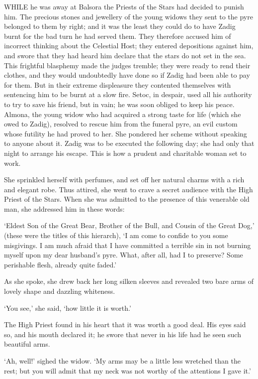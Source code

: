 \documentclass{article}
\begin{document}
\begin{center}
 

WHILE he was away at Balsora the Priests of the Stars had decided to punish him. 
The precious stones and jewellery of the young widows they sent to the pyre belonged 
to them by right; and it was the least they could do to have Zadig burnt for the 
bad turn he had served them. They therefore accused him of incorrect thinking about 
the Celestial Host; they entered depositions against him, and swore that they had 
heard him declare that the stars do not set in the sea. This frightful blasphemy 
made the judges tremble; they were ready to rend their clothes, and they would 
undoubtedly have done so if Zadig had been able to pay for them. But in their extreme 
displeasure they contented themselves with sentencing him to be burnt at a slow 
fire. Setoc, in despair, used all his authority to try to save his friend, but 
in vain; he was soon obliged to keep his peace. Almona, the young widow who had 
acquired a strong taste for life (which she owed to Zadig), resolved to rescue 
him from the funeral pyre, an evil custom whose futility he had proved to her. 
She pondered her scheme without speaking to anyone about it. Zadig was to be executed 
the following day; she had only that night to arrange his escape. This is how a 
prudent and charitable woman set to work. 

She sprinkled herself with perfumes, and set off her natural charms with a rich 
and elegant robe. Thus attired, she went to crave a secret audience with the High 
Priest of the Stars. When she was admitted to the presence of this venerable old 
man, she addressed him in these words: 

`Eldest Son of the Great Bear, Brother of the Bull, and Cousin of the Great Dog,' 
(these were the titles of this hierarch), `I am come to confide to you some misgivings. 
I am much afraid that I have committed a terrible sin in not burning myself upon 
my dear husband's pyre. What, after all, had I to preserve? Some perishable flesh, 
already quite faded.' 

As she spoke, she drew back her long silken sleeves and revealed two bare arms 
of lovely shape and dazzling whiteness. 

`You see,' she said, `how little it is worth.' 

The High Priest found in his heart that it was worth a good deal. His eyes said 
so, and his mouth declared it; he swore that never in his life had he seen such 
beautiful arms. 

`Ah, well!' sighed the widow. `My arms may be a little less wretched than the rest; 
but you will admit that my neck was not worthy of the attentions I gave it.' 


\end{center}
\end{document}
